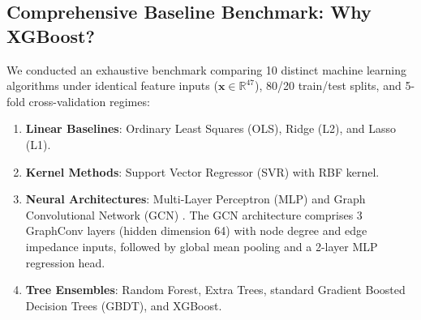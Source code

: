 \documentclass[journal]{IEEEtran}
\begin{document}
\subsection{Comprehensive Baseline Benchmark: Why XGBoost?}
We conducted an exhaustive benchmark comparing 10 distinct machine learning algorithms under identical feature inputs ($\mathbf{x} \in \mathbb{R}^{47}$), 80/20 train/test splits, and 5-fold cross-validation regimes:
\begin{enumerate}
    \item \textbf{Linear Baselines}: Ordinary Least Squares (OLS), Ridge (L2), and Lasso (L1).
    \item \textbf{Kernel Methods}: Support Vector Regressor (SVR) with RBF kernel.
    \item \textbf{Neural Architectures}: Multi-Layer Perceptron (MLP) and Graph Convolutional Network (GCN) \cite{Kipf2017}. The GCN architecture comprises 3 GraphConv layers (hidden dimension 64) with node degree and edge impedance inputs, followed by global mean pooling and a 2-layer MLP regression head.
    \item \textbf{Tree Ensembles}: Random Forest, Extra Trees, standard Gradient Boosted Decision Trees (GBDT), and XGBoost.
\end{enumerate}
\end{document}
